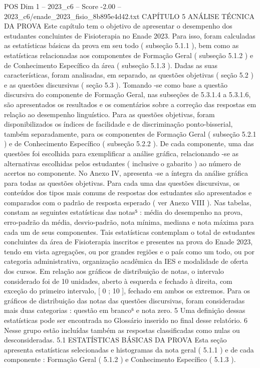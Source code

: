 \begin{textsample}{POS Dim 1 – 2023\_c6 – Score -2.00 – 2023\_c6/enade\_2023\_fisio\_8b895e4d42.txt}  \label{ex:f1_pos_238}
CAPÍTULO 5 ANÁLISE TÉCNICA DA PROVA Este capítulo tem o objetivo de apresentar o desempenho dos estudantes concluintes de Fisioterapia no Enade 2023.
Para isso, foram calculadas as estatísticas básicas da prova em seu todo ( subseção 5.1.1 ), bem como as estatísticas relacionadas aos componentes de Formação Geral ( subseção 5.1.2 ) e de Conhecimento Específico da área ( subseção 5.1.3 ).
Dadas as suas características, foram analisadas, em separado, as questões objetivas ( seção 5.2 ) e as questões discursivas ( seção 5.3 ).
Tomando -se como base a questão discursiva do componente de Formação Geral, nas subseções de 5.3.1.4 a 5.3.1.6, são apresentados os resultados e os comentários sobre a correção das respostas em relação ao desempenho linguístico.
Para as questões objetivas, foram disponibilizados os índices de facilidade e de discriminação ponto-bisserial, também separadamente, para os componentes de Formação Geral ( subseção 5.2.1 ) e de Conhecimento Específico ( subseção 5.2.2 ).
De cada componente, uma das questões foi escolhida para exemplificar a análise gráfica, relacionando -se as alternativas escolhidas pelos estudantes ( inclusive o gabarito ) ao número de acertos no componente.
No Anexo IV, apresenta -se a íntegra da análise gráfica para todas as questões objetivas.
Para cada uma das questões discursivas, os conteúdos dos tipos mais comuns de respostas dos estudantes são apresentados e comparados com o padrão de resposta esperado ( ver Anexo VIII ).
Nas tabelas, constam as seguintes estatísticas das notas⁵ : média do desempenho na prova, erro-padrão da média, desvio-padrão, nota mínima, mediana e nota máxima para cada um de seus componentes.
Tais estatísticas contemplam o total de estudantes concluintes da área de Fisioterapia inscritos e presentes na prova do Enade 2023, tendo em vista agregações, ou por grandes regiões e o país como um todo, ou por categoria administrativa, organização acadêmica da IES e modalidade de oferta dos cursos.
Em relação aos gráficos de distribuição de notas, o intervalo considerado foi de 10 unidades, aberto à esquerda e fechado à direita, com exceção do primeiro intervalo, [ 0 ; 10 ], fechado em ambos os extremos.
Para os gráficos de distribuição das notas das questões discursivas, foram consideradas mais duas categorias : questão em branco⁶ e nota zero. 5 Uma definição dessas estatísticas pode ser encontrada no Glossário inserido no final desse relatório. 6 Nesse grupo estão incluídas também as respostas classificadas como nulas ou desconsideradas. 5.1 ESTATÍSTICAS BÁSICAS DA PROVA Esta seção apresenta estatísticas selecionadas e histogramas da nota geral ( 5.1.1 ) e de cada componente : Formação Geral ( 5.1.2 ) e Conhecimento Específico ( 5.1.3 ).

\end{textsample}
